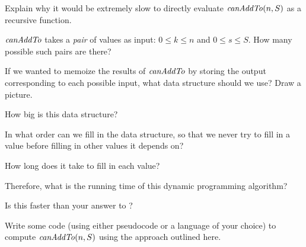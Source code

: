 \documentclass{tufte-handout}
\begin{document}
\begin{questions}
  \item Explain why it would be extremely slow to directly evaluate
    $\mathit{canAddTo}(n,S)$ as a recursive function.
  \item $\mathit{canAddTo}$ takes a \emph{pair} of values as input:
    $0 \leq k \leq n$ and $0 \leq s \leq S$.  How many possible such
    pairs are there?
  \item If we wanted to memoize the results of $\mathit{canAddTo}$ by storing
    the output corresponding to each possible input, what data
    structure should we use?  Draw a picture.
  \item How big is this data structure?
  \newpage
  \item In what order can we fill in the data structure, so that we
    never try to fill in a value before filling in other values it
    depends on?
  \item How long does it take to fill in each value?
  \item Therefore, what is the running time of this dynamic
    programming algorithm?
  \item Is this faster than your answer to
    ?
  \item Write some code (using either pseudocode or a language of your
    choice) to compute $\mathit{canAddTo}(n,S)$ using the approach outlined
    here.
\end{questions}
\end{document}
